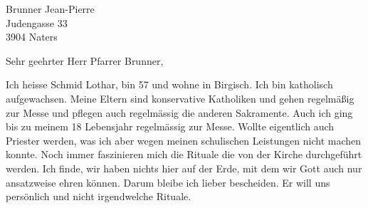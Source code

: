 \documentclass[
    12pt,
    a4paper,
    letter,
    parskip=yes,
    ]{scrlttr2}
\date{\today}
\begin{document}
\setlength{\baselineskip}{1.2\baselineskip}  %
\begin{letter}{
Brunner Jean-Pierre\\
Judengasse 33\\
3904 Naters}

\opening{Sehr geehrter Herr Pfarrer Brunner,}


Ich heisse Schmid Lothar, bin 57 und wohne in Birgisch. Ich bin katholisch aufgewachsen. Meine Eltern sind konservative Katholiken und gehen regelmäßig zur Messe und pflegen auch regelmässig die anderen Sakramente. Auch ich ging bis zu meinem 18 Lebensjahr regelmässig zur Messe. Wollte eigentlich auch Priester werden, was ich aber wegen meinen schulischen Leistungen nicht machen konnte. Noch immer faszinieren mich die Rituale die von der Kirche durchgeführt werden. Ich finde, wir haben nichts hier auf der Erde, mit dem wir Gott auch nur ansatzweise ehren können. Darum bleibe ich lieber bescheiden. Er will uns persönlich und nicht irgendwelche Rituale.


\end{letter}
\end{document}
